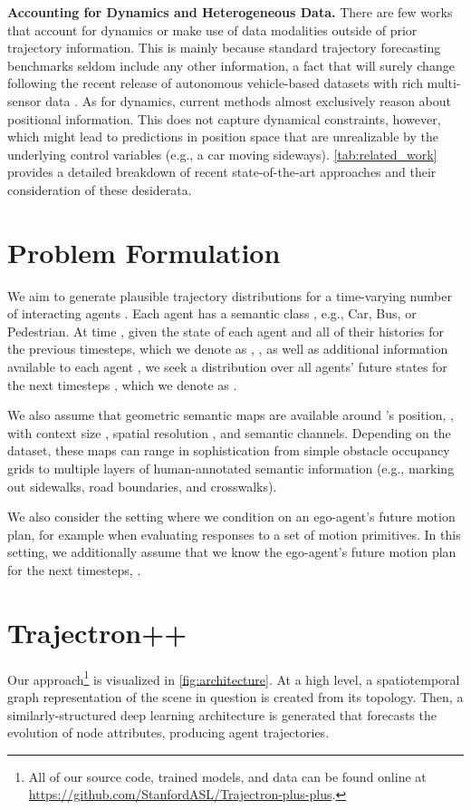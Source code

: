 \documentclass[runningheads]{llncs}
\newcommand{\algname}{\mbox{Trajectron++}}
\begin{document}
{\bf Accounting for Dynamics and Heterogeneous Data.} There are few works that account for dynamics or make use of data modalities outside of prior trajectory information. This is mainly because standard trajectory forecasting benchmarks seldom include any other information, a fact that will surely change following the recent release of autonomous vehicle-based datasets with rich multi-sensor data \cite{waymo_open_dataset,CaesarBankitiEtAl2019,ChangLambertEtAl2019,lyft_dataset2019}.
As for dynamics, current methods almost exclusively reason about positional information. This does not capture dynamical constraints, however, which might lead to predictions in position space that are unrealizable by the underlying control variables (e.g., a car moving sideways).
\cref{tab:related_work} provides a detailed breakdown of recent state-of-the-art approaches and their consideration of these desiderata.



\section{Problem Formulation}
We aim to generate plausible trajectory distributions for a time-varying number  of interacting agents . Each agent  has a semantic class , e.g., Car, Bus, or Pedestrian. At time , given 
the state  of each agent
and all of their histories for the previous  timesteps, which we denote as , , as well as additional information available to each agent , we seek a distribution over all agents' future states for the next  timesteps , which we denote as .


We also assume that geometric semantic maps are available around 's position, , with context size , spatial resolution , and  semantic channels. Depending on the dataset, these maps can range in sophistication from simple obstacle occupancy grids to multiple layers of human-annotated semantic information (e.g., marking out sidewalks, road boundaries, and crosswalks). 

We also consider the setting where we condition on an ego-agent's future motion plan, for example when evaluating responses to a set of motion primitives. In this setting, we additionally assume that we know the ego-agent's future motion plan for the next  timesteps, .




\section{\algname{}} \label{sec:model}
Our approach\footnote{All of our source code, trained models, and data can be found online at\\ \url{https://github.com/StanfordASL/Trajectron-plus-plus}.} is visualized in \cref{fig:architecture}. At a high level, a spatiotemporal graph representation of the scene in question is created from its topology. Then, a similarly-structured deep learning architecture is generated that forecasts the evolution of node attributes, producing agent trajectories.
\end{document}
